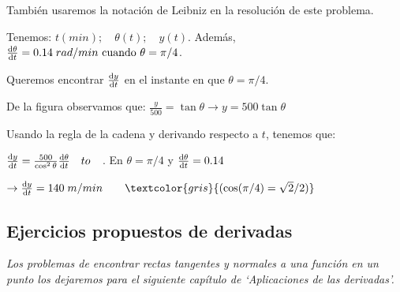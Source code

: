 	
	\begin{proofw}\renewcommand{\qedsymbol}{$\diamond$} 
	
También usaremos la notación de Leibniz en la resolución de este problema.
	
	Tenemos: $t(min); \quad \theta (t); \quad y(t)$. Además, $\dv {\theta}{t}=0.14 \; rad/min \mbox{  cuando  } \theta=\pi/4$.
	
	Queremos encontrar $\dv {y}{t}$ en el instante en que $\theta=\pi/4$.
	
	De la figura observamos que: $\frac y {500}=\tan \theta \to y=500 \tan \theta$
	
	Usando la regla de la cadena y derivando respecto a $t$, tenemos que:
	
	$\dv {y}{t}=\frac {500}{\cos^2 \theta} \dv {\theta}{t} \quad to \quad $. En $\theta=\pi/4$ y $\dv {\theta}{t}=0.14 \quad $
	
	$\to \dv {y}{t}=140 \; m/min \qquad \textcolor{gris}{(\cos(\pi/4)=\sqrt{2}/
	2)}$ 
		
	\end{proofw}


	\subsection{Ejercicios propuestos de derivadas}
	
	\emph{Los problemas de encontrar rectas tangentes y normales a una función en un punto los dejaremos para el siguiente capítulo de `Aplicaciones de las derivadas'.}

